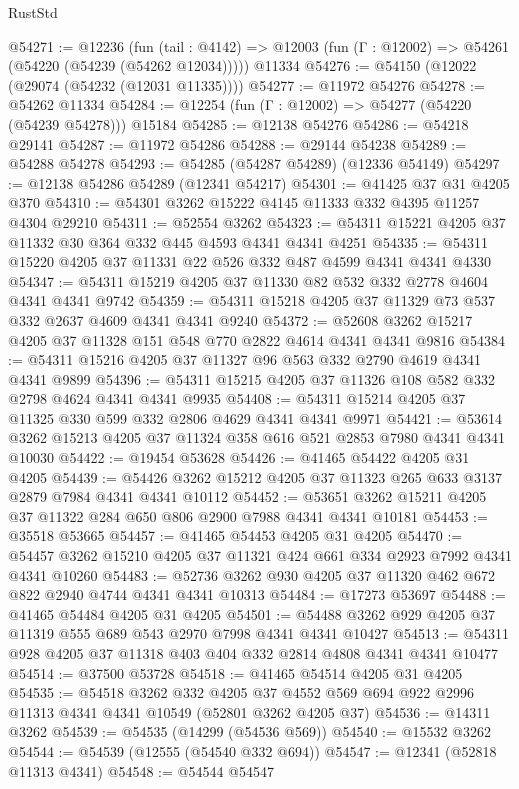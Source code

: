 \begin{lexlean}{RustStd}
\begin{coremodule}
@54271 := @12236
    (fun (tail : @4142) => @12003 (fun (Γ : @12002) => @54261 (@54220 (@54239 (@54262 @12034)))))
    @11334
@54276 := @54150 (@12022 (@29074 (@54232 (@12031 @11335))))
@54277 := @11972 @54276
@54278 := @54262 @11334
@54284 := @12254 (fun (Γ : @12002) => @54277 (@54220 (@54239 @54278))) @15184
@54285 := @12138 @54276
@54286 := @54218 @29141
@54287 := @11972 @54286
@54288 := @29144 @54238
@54289 := @54288 @54278
@54293 := @54285 (@54287 @54289) (@12336 @54149)
@54297 := @12138 @54286 @54289 (@12341 @54217)
@54301 := @41425 @37 @31 @4205 @370
@54310 := @54301 @3262 @15222 @4145 @11333 @332 @4395 @11257 @4304 @29210
@54311 := @52554 @3262
@54323 := @54311 @15221 @4205 @37 @11332 @30 @364 @332 @445 @4593 @4341 @4341 @4251
@54335 := @54311 @15220 @4205 @37 @11331 @22 @526 @332 @487 @4599 @4341 @4341 @4330
@54347 := @54311 @15219 @4205 @37 @11330 @82 @532 @332 @2778 @4604 @4341 @4341 @9742
@54359 := @54311 @15218 @4205 @37 @11329 @73 @537 @332 @2637 @4609 @4341 @4341 @9240
@54372 := @52608 @3262 @15217 @4205 @37 @11328 @151 @548 @770 @2822 @4614 @4341 @4341 @9816
@54384 := @54311 @15216 @4205 @37 @11327 @96 @563 @332 @2790 @4619 @4341 @4341 @9899
@54396 := @54311 @15215 @4205 @37 @11326 @108 @582 @332 @2798 @4624 @4341 @4341 @9935
@54408 := @54311 @15214 @4205 @37 @11325 @330 @599 @332 @2806 @4629 @4341 @4341 @9971
@54421 := @53614 @3262 @15213 @4205 @37 @11324 @358 @616 @521 @2853 @7980 @4341 @4341 @10030
@54422 := @19454 @53628
@54426 := @41465 @54422 @4205 @31 @4205
@54439 := @54426 @3262 @15212 @4205 @37 @11323 @265 @633 @3137 @2879 @7984 @4341 @4341 @10112
@54452 := @53651 @3262 @15211 @4205 @37 @11322 @284 @650 @806 @2900 @7988 @4341 @4341 @10181
@54453 := @35518 @53665
@54457 := @41465 @54453 @4205 @31 @4205
@54470 := @54457 @3262 @15210 @4205 @37 @11321 @424 @661 @334 @2923 @7992 @4341 @4341 @10260
@54483 := @52736 @3262 @930 @4205 @37 @11320 @462 @672 @822 @2940 @4744 @4341 @4341 @10313
@54484 := @17273 @53697
@54488 := @41465 @54484 @4205 @31 @4205
@54501 := @54488 @3262 @929 @4205 @37 @11319 @555 @689 @543 @2970 @7998 @4341 @4341 @10427
@54513 := @54311 @928 @4205 @37 @11318 @403 @404 @332 @2814 @4808 @4341 @4341 @10477
@54514 := @37500 @53728
@54518 := @41465 @54514 @4205 @31 @4205
@54535 := @54518
    @3262
    @332
    @4205
    @37
    @4552
    @569
    @694
    @922
    @2996
    @11313
    @4341
    @4341
    @10549
    (@52801 @3262 @4205 @37)
@54536 := @14311 @3262
@54539 := @54535 (@14299 (@54536 @569))
@54540 := @15532 @3262
@54544 := @54539 (@12555 (@54540 @332 @694))
@54547 := @12341 (@52818 @11313 @4341)
@54548 := @54544 @54547

\end{coremodule}
\end{lexlean}
